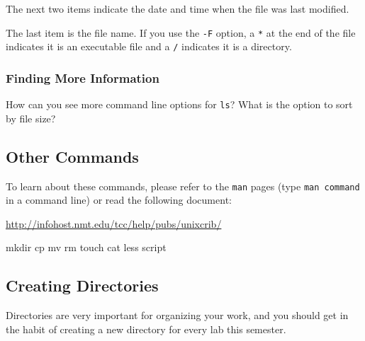 \documentclass[11pt]{cselabheader}
\begin{document}
The next two items indicate the date and time when the file was last modified.

The last item is the file name. If you use the \texttt{-F} option, a \texttt{*}
at the end of the file indicates it is an executable file and a \texttt{/}
indicates it is a directory.

\subsubsection*{Finding More Information}

How can you see more command line options for \texttt{ls}? What is the option to
sort by file size?

\subsection{Other Commands}

To learn about these commands, please refer to the \texttt{man} pages (type
\texttt{man command} in a command line) or read the following document:
\begin{center}
\url{http://infohost.nmt.edu/tcc/help/pubs/unixcrib/}
\end{center}

\begin{bashcode}
mkdir 
cp
mv
rm
touch
cat
less
script
\end{bashcode}

\subsection{Creating Directories}
Directories are very important for organizing your work, and you should get in
the habit of creating a new directory for every lab this semester.
\end{document}
